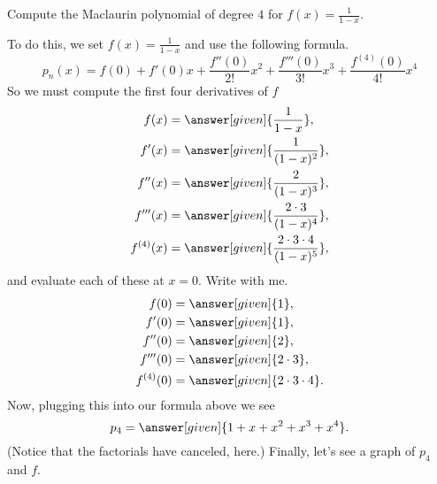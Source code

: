 \documentclass{ximera}
\begin{document}
\begin{example}
  Compute the Maclaurin polynomial of degree $4$ for $f(x) =
  \frac{1}{1-x}$.
  \begin{explanation}
    To do this, we set $f(x) =\frac{1}{1-x}$ and use the following formula.
    \[
    p_n(x) = f(0) + f'(0)x +\frac{f''(0)}{2!}x^2+\frac{f'''(0)}{3!}x^3+\frac{f^{(4)}(0)}{4!}x^4
    \]
    So we must compute the first four derivatives of $f$
    \begin{align*}
      f(x) &= \answer[given]{\frac{1}{1-x}},\\
      f'(x) &= \answer[given]{\frac{1}{(1-x)^2}},\\
      f''(x) &= \answer[given]{\frac{2}{(1-x)^3}},\\
      f'''(x) &= \answer[given]{\frac{2\cdot 3}{(1-x)^4}},\\
      f^{(4)}(x) &= \answer[given]{\frac{2\cdot 3\cdot 4}{(1-x)^5}},
    \end{align*}
    and evaluate each of these at $x=0$. Write with me.
    \begin{align*}
      f(0) &= \answer[given]{1},\\
      f'(0) &= \answer[given]{1},\\
      f''(0) &= \answer[given]{2},\\
      f'''(0) &=\answer[given]{2\cdot 3},\\
      f^{(4)}(0) &= \answer[given]{2\cdot 3\cdot 4}.
    \end{align*}
    Now, plugging this into our formula above we see
    \[
    p_4 = \answer[given]{1 + x + x^2 + x^3 + x^4}.
    \]
    (Notice that the factorials have canceled, here.)  Finally, let's see a graph of $p_4$ and $f$.
      \begin{image}
  \end{image}
  \end{explanation}
\end{example}
\end{document}
